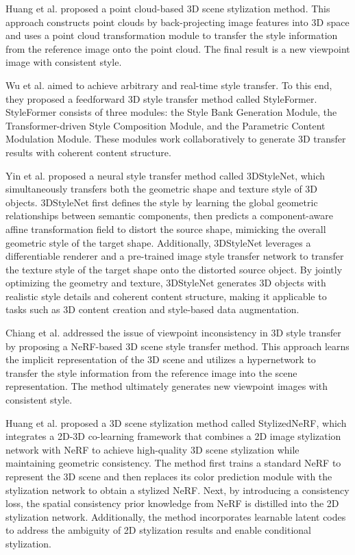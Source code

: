 \documentclass[preprint,12pt]{elsarticle}
\begin{document}
Huang et al.\citep{87huang2021learning} proposed a point cloud-based 3D scene stylization method. This approach constructs point clouds by back-projecting image features into 3D space and uses a point cloud transformation module to transfer the style information from the reference image onto the point cloud. The final result is a new viewpoint image with consistent style.

Wu et al.\citep{88wu2021styleformer} aimed to achieve arbitrary and real-time style transfer. To this end, they proposed a feedforward 3D style transfer method called StyleFormer. StyleFormer consists of three modules: the Style Bank Generation Module, the Transformer-driven Style Composition Module, and the Parametric Content Modulation Module. These modules work collaboratively to generate 3D transfer results with coherent content structure.

Yin et al.\citep{89yin20213dstylenet} proposed a neural style transfer method called 3DStyleNet, which simultaneously transfers both the geometric shape and texture style of 3D objects. 3DStyleNet first defines the style by learning the global geometric relationships between semantic components, then predicts a component-aware affine transformation field to distort the source shape, mimicking the overall geometric style of the target shape. Additionally, 3DStyleNet leverages a differentiable renderer and a pre-trained image style transfer network to transfer the texture style of the target shape onto the distorted source object. By jointly optimizing the geometry and texture, 3DStyleNet generates 3D objects with realistic style details and coherent content structure, making it applicable to tasks such as 3D content creation and style-based data augmentation.

Chiang et al.\citep{90chiang2022stylizing} addressed the issue of viewpoint inconsistency in 3D style transfer by proposing a NeRF-based 3D scene style transfer method. This approach learns the implicit representation of the 3D scene and utilizes a hypernetwork to transfer the style information from the reference image into the scene representation. The method ultimately generates new viewpoint images with consistent style.

Huang et al.\citep{93huang2022stylizednerf} proposed a 3D scene stylization method called StylizedNeRF, which integrates a 2D-3D co-learning framework that combines a 2D image stylization network with NeRF to achieve high-quality 3D scene stylization while maintaining geometric consistency. The method first trains a standard NeRF to represent the 3D scene and then replaces its color prediction module with the stylization network to obtain a stylized NeRF. Next, by introducing a consistency loss, the spatial consistency prior knowledge from NeRF is distilled into the 2D stylization network. Additionally, the method incorporates learnable latent codes to address the ambiguity of 2D stylization results and enable conditional stylization.
\end{document}
